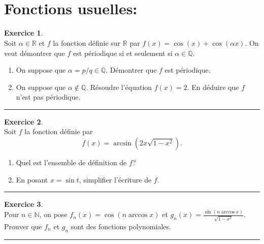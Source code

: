 \documentclass[a4paper,11pt]{article}
\theoremstyle{definition}
\newtheorem{exo}{Exercice} %
\begin{document}
\hfill\\\hfill\\
\begin{minipage}{1\linewidth}
	\begin{minipage}[t]{0.48\linewidth}
		\raggedright
		\section*{Fonctions usuelles:}%
		\begin{exo}\textit{ }\quad\\[0.25cm]
			Soit $\alpha\in\mathbb R$ et $f$ la fonction définie sur $\mathbb R$ par $f(x)=\cos(x)+\cos(\alpha x)$. On veut démontrer que $f$ est périodique si et seulement si $\alpha\in\mathbb Q$.
			\begin{enumerate}
				\item On suppose que $\alpha=p/q\in\mathbb Q$. Démontrer que $f$ est périodique.
				\item On suppose que $\alpha\notin\mathbb Q$. Résoudre l'équation $f(x)=2$. En déduire que $f$ n'est pas périodique.
			\end{enumerate}
			
			\centering
			\rule{1\linewidth}{0.6pt}
		\end{exo}
		
		
		
		\begin{exo}\textit{}\quad\\
			Soit $f$ la fonction définie par 
			$$f(x)=\arcsin\left(2x\sqrt{1-x^2}\right).$$
			\begin{enumerate}
				\item Quel est l'ensemble de définition de $f$?
				\item En posant $x=\sin t$, simplifier l'écriture de $f$.
			\end{enumerate}
			
			\centering
			\rule{1\linewidth}{0.6pt}
		\end{exo}
		
		\begin{exo}\quad\\
			Pour $n\in\mathbb N$, on pose $f_n(x)=\cos(n\arccos x)$ et $g_n(x)=\frac{\sin(n \arccos x)}{\sqrt{1-x^2}}$.
			Prouver que $f_n$ et $g_n$ sont des fonctions polynomiales.
			
			\centering
			\rule{1\linewidth}{0.6pt}
		\end{exo}
		

\end{minipage}
\end{minipage}
\end{document}
